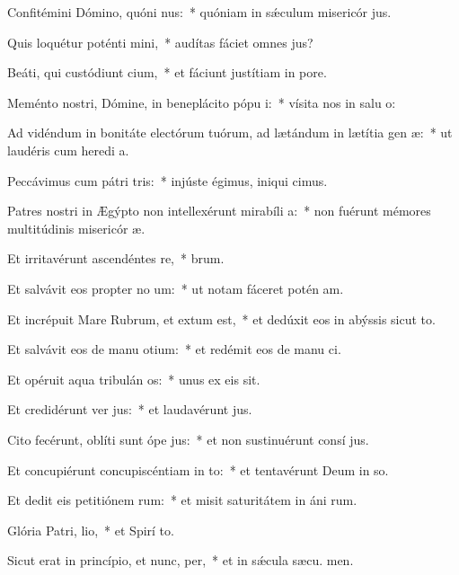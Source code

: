 \item Confitémini Dómino, quóni nus:~* quóniam in sǽculum misericór jus.
\item Quis loquétur poténti mini,~* audítas fáciet omnes  jus?
\item Beáti, qui custódiunt cium,~* et fáciunt justítiam in  pore.
\item Meménto nostri, Dómine, in beneplácito pópu i:~* vísita nos in salu o:
\item Ad vidéndum in bonitáte electórum tuórum, ad lætándum in lætítia gen æ:~* ut laudéris cum heredi a.
\item Peccávimus cum pátri tris:~* injúste égimus, iniqui cimus.
\item Patres nostri in Ægýpto non intellexérunt mirabíli a:~* non fuérunt mémores multitúdinis misericór æ.
\item Et irritavérunt ascendéntes  re,~*  brum.
\item Et salvávit eos propter no um:~* ut notam fáceret potén am.
\item Et incrépuit Mare Rubrum, et extum est,~* et dedúxit eos in abýssis sicut  to.
\item Et salvávit eos de manu otium:~* et redémit eos de manu ci.
\item Et opéruit aqua tribulán os:~* unus ex eis  sit.
\item Et credidérunt ver jus:~* et laudavérunt  jus.
\item Cito fecérunt, oblíti sunt ópe jus:~* et non sustinuérunt consí jus.
\item Et concupiérunt concupiscéntiam in to:~* et tentavérunt Deum in so.
\item Et dedit eis petitiónem rum:~* et misit saturitátem in áni rum.
\item Glória Patri,  lio,~* et Spirí to.
\item Sicut erat in princípio, et nunc,  per,~* et in sǽcula sæcu. men.
